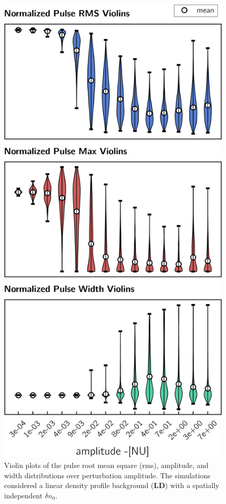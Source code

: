 \documentclass[11pt,openany]{report}
\begin{document}
\begin{multicols}{2}
    \begin{figure}[H]
        \centering
        \includegraphics[width=1\linewidth]{./figures/pulse_overview.png}
        \caption{Violin plots of the pulse root mean square (rms), amplitude, and width distributions over perturbation amplitude. The simulations considered a linear density profile background (\textbf{LD}) with a spatially independent $\delta n_0$.}

\end{figure}
\end{multicols}
\end{document}

